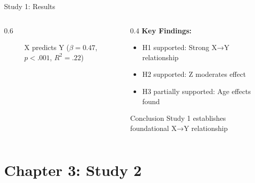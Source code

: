 \documentclass[aspectratio=169,12pt]{beamer}
\begin{document}
\begin{frame}{Study 1: Results}
  \begin{columns}[c]
    
    \begin{column}{0.6\textwidth}
      \begin{figure}
        \centering
        \caption{X predicts Y ($\beta = 0.47$, $p < .001$, $R^2 = .22$)}
      \end{figure}
    \end{column}
    
    \begin{column}{0.4\textwidth}
      \textbf{Key Findings:}
      \begin{itemize}
        \item H1 supported: Strong X→Y relationship
        \item H2 supported: Z moderates effect
        \item H3 partially supported: Age effects found
      \end{itemize}
      
      \vspace{0.5cm}
      
      \begin{block}{Conclusion}
        Study 1 establishes foundational X→Y relationship
      \end{block}
    \end{column}
    
  \end{columns}
\end{frame}


\section{Chapter 3: Study 2}
\end{document}
